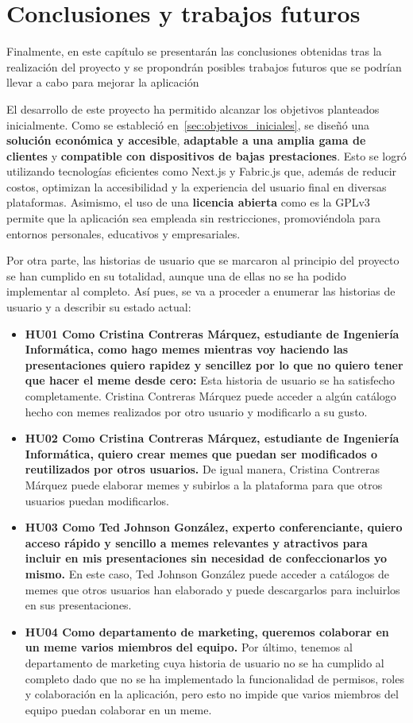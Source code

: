 \chapter{Conclusiones y trabajos futuros}

Finalmente, en este capítulo se presentarán las conclusiones obtenidas tras la realización del proyecto y se propondrán posibles trabajos futuros que se podrían llevar a cabo para mejorar la aplicación

El desarrollo de este proyecto ha permitido alcanzar los objetivos planteados inicialmente. Como se estableció en~\ref{sec:objetivos_iniciales}, se diseñó una \textbf{solución económica y accesible}, \textbf{adaptable a una amplia gama de clientes} y \textbf{compatible con dispositivos de bajas prestaciones}. Esto se logró utilizando tecnologías eficientes como Next.js y Fabric.js que, además de reducir costos, optimizan la accesibilidad y la experiencia del usuario final en diversas plataformas. Asimismo, el uso de una \textbf{licencia abierta} como es la GPLv3~\cite{gplv3} permite que la aplicación sea empleada sin restricciones, promoviéndola para entornos personales, educativos y empresariales.

Por otra parte, las historias de usuario que se marcaron al principio del proyecto se han cumplido en su totalidad, aunque una de ellas no se ha podido implementar al completo. Así pues, se va a proceder a enumerar las historias de usuario y a describir su estado actual:

\begin{itemize}
  \item[\bien] \textbf{HU01 Como Cristina Contreras Márquez, estudiante de Ingeniería Informática, como hago memes mientras voy haciendo las presentaciones quiero rapidez y sencillez por lo que no quiero tener que hacer el meme desde cero:} Esta historia de usuario se ha satisfecho completamente. Cristina Contreras Márquez puede acceder a algún catálogo hecho con memes realizados por otro usuario y modificarlo a su gusto.
  \item[\bien] \textbf{HU02 Como Cristina Contreras Márquez, estudiante de Ingeniería Informática, quiero crear memes que puedan ser modificados o reutilizados por otros usuarios.} De igual manera, Cristina Contreras Márquez puede elaborar memes y subirlos a la plataforma para que otros usuarios puedan modificarlos.
  \item[\bien] \textbf{HU03 Como Ted Johnson González, experto conferenciante, quiero acceso rápido y sencillo a memes relevantes y atractivos para incluir en mis presentaciones sin necesidad de confeccionarlos yo mismo.} En este caso, Ted Johnson González puede acceder a catálogos de memes que otros usuarios han elaborado y puede descargarlos para incluirlos en sus presentaciones.
  \item[\regular] \textbf{HU04 Como departamento de marketing, queremos colaborar en un meme varios miembros del equipo.} Por último, tenemos al departamento de marketing cuya historia de usuario no se ha cumplido al completo dado que no se ha implementado la funcionalidad de permisos, roles y colaboración en la aplicación, pero esto no impide que varios miembros del equipo puedan colaborar en un meme.
\end{itemize}

